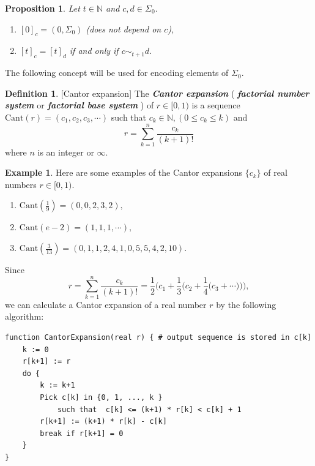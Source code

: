 \documentclass[12pt, a4paper]{amsart}
\theoremstyle{plain}
\newtheorem{prop}[thm]{Proposition}
\theoremstyle{definition}
\newtheorem{defn}[thm]{Definition}
\newtheorem{exmp}[thm]{Example}
\numberwithin{figure}{section}
\numberwithin{table}{section}
\newcommand{\twc}[2]{ %
  [ #1 ]_{ #2 }
}
\newcommand{\newword}[1]{\textbf{\textit{#1}}}
\numberwithin{equation}{section}
\begin{document}
\begin{prop}
\label{prop:timeInContext}
Let
$
t
	\in
\mathbb{N}
$
and
$c, d \in \Sigma_0$.
\begin{enumerate}
\item
$
\twc{0}{c}
	=
(0, \Sigma_0)
$
	\quad
(does not depend on $c$),

\item
$
\twc{t}{c}
	=
\twc{t}{d}
$
if and only if
$
c \sim_{t+1} d .
$
\end{enumerate}
\end{prop}



The following concept will be used for encoding elements of 
$\Sigma_0$.


\begin{defn}{[Cantor expansion]}
\label{defn:cantorExp}
The
\newword{Cantor expansion}
(
\newword{factorial number system}
or
\newword{factorial base system}
)
of
$r
	\in
[0,1)
$
is a sequence
$
\mathrm{Cant}(
	r)
=
(
c_1,
c_2,
c_3,
\cdots
)
$
such that
$c_k \in \mathbb{N}, (0 \le c_k \le k)$
and
\begin{equation}
\label{eq:CantorExp}
r
	=
\sum_{k=1}^{n}
	\frac{c_k}{(k+1)!}
\end{equation}
where
$n$ is an integer or $\infty$.
\end{defn}


\begin{exmp}
Here are some examples of
the Cantor expansions $\{c_k\}$ of real numbers $r \in [0,1)$.
\begin{enumerate}
	\item
$
\mathrm{Cant}(
\frac{1}{9}
) =
(0, 0, 2, 3, 2) ,
$
  \item
$
\mathrm{Cant}(
e - 2
) =
(1, 1, 1, \cdots ) ,
$
  \item
$
\mathrm{Cant}(
\frac{3}{13}
) =
(0, 1, 1, 2, 4, 1, 0, 5, 5, 4, 2, 10) .
$

\end{enumerate}
\end{exmp}

Since
\[
r
	=
\sum_{k=1}^{n}
	\frac{c_k}{(k+1)!}
	=
\frac{1}{2}
\big(
	c_1
		+
	\frac{1}{3}
	\big(
		c_2
			+
		\frac{1}{4}
		\big(
			c_3
				+
			\cdots
		\big)
	\big)
\big),
\]
we can calculate a Cantor expansion of a real number
$r$
by the following algorithm:
\begin{lstlisting}
function CantorExpansion(real r) { # output sequence is stored in c[k]
	k := 0
	r[k+1] := r
	do {
		k := k+1
		Pick c[k] in {0, 1, ..., k }
			such that  c[k] <= (k+1) * r[k] < c[k] + 1
		r[k+1] := (k+1) * r[k] - c[k]
		break if r[k+1] = 0
	}
}
\end{lstlisting}
\end{document}
